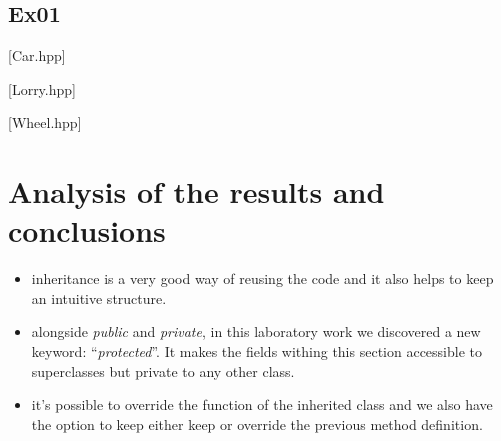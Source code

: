 \documentclass{article}
\begin{document}
		\subsection{Ex01}
			\begin{center}
				\begin{minipage}{\linewidth}
					[Car.hpp]
				\end{minipage}

				\begin{minipage}{\linewidth}
					[Lorry.hpp]
				\end{minipage}

				\begin{minipage}{\linewidth}
					[Wheel.hpp]
				\end{minipage}
			\end{center}

	\section{Analysis of the results and conclusions}
		\begin{itemize}
			\item inheritance is a very good way of reusing the code and it also helps to keep an intuitive structure.

			\item alongside \textit{public} and \textit{private}, in this laboratory work we discovered a new keyword: ``\textit{protected}''. It makes the fields withing this section accessible to superclasses but private to any other class.

			\item it's possible to override the function of the inherited class and we also have the option to keep either keep or override the previous method definition.
		\end{itemize}
\end{document}
